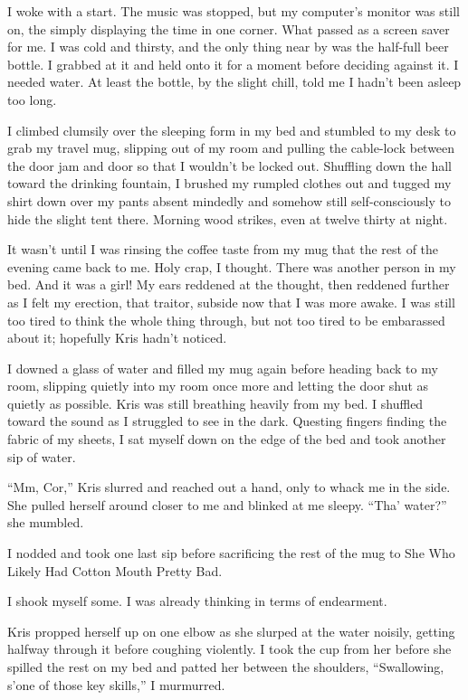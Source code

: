 I woke with a start.  The music was stopped, but my computer's monitor was still on, the simply displaying the time in one corner.  What passed as a screen saver for me.  I was cold and thirsty, and the only thing near by was the half-full beer bottle.  I grabbed at it and held onto it for a moment before deciding against it.  I needed water.  At least the bottle, by the slight chill, told me I hadn't been asleep too long.

I climbed clumsily over the sleeping form in my bed and stumbled to my desk to grab my travel mug, slipping out of my room and pulling the cable-lock between the door jam and door so that I wouldn't be locked out.  Shuffling down the hall toward the drinking fountain, I brushed my rumpled clothes out and tugged my shirt down over my pants absent mindedly and somehow still self-consciously to hide the slight tent there.  Morning wood strikes, even at twelve thirty at night.

It wasn't until I was rinsing the coffee taste from my mug that the rest of the evening came back to me.  Holy crap, I thought.  There was another person in my bed.  And it was a girl!  My ears reddened at the thought, then reddened further as I felt my erection, that traitor, subside now that I was more awake.  I was still too tired to think the whole thing through, but not too tired to be embarassed about it; hopefully Kris hadn't noticed.

I downed a glass of water and filled my mug again before heading back to my room, slipping quietly into my room once more and letting the door shut as quietly as possible.  Kris was still breathing heavily from my bed.  I shuffled toward the sound as I struggled to see in the dark.  Questing fingers finding the fabric of my sheets, I sat myself down on the edge of the bed and took another sip of water.

``Mm, Cor,'' Kris slurred and reached out a hand, only to whack me in the side.  She pulled herself around closer to me and blinked at me sleepy.  ``Tha' water?'' she mumbled.

I nodded and took one last sip before sacrificing the rest of the mug to She Who Likely Had Cotton Mouth Pretty Bad.

I shook myself some.  I was already thinking in terms of endearment.

Kris propped herself up on one elbow as she slurped at the water noisily, getting halfway through it before coughing violently.  I took the cup from her before she spilled the rest on my bed and patted her between the shoulders, ``Swallowing, s'one of those key skills,'' I murmurred.

